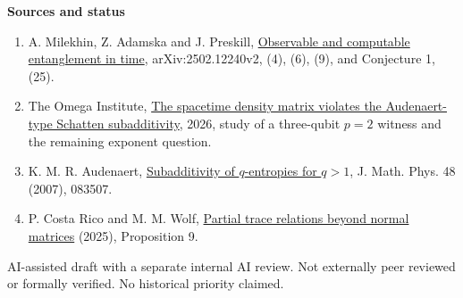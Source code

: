 \documentclass[11pt]{article}
\begin{document}
\textbf{Sources and status}
\begin{enumerate}
\item A. Milekhin, Z. Adamska and J. Preskill, \href{https://arxiv.org/html/2502.12240v2}{Observable and computable entanglement in time}, arXiv:2502.12240v2, (4), (6), (9), and Conjecture 1, (25).
\item The Omega Institute, \href{https://www.trureturing.org/research/milekhin-adamska-preskill-2025-spacetime-schatten-subadditivity/}{The spacetime density matrix violates the Audenaert-type Schatten subadditivity}, 2026, study of a three-qubit $p=2$ witness and the remaining exponent question.
\item K. M. R. Audenaert, \href{https://doi.org/10.1063/1.2771542}{Subadditivity of $q$-entropies for $q>1$}, J. Math. Phys. 48 (2007), 083507.
\item P. Costa Rico and M. M. Wolf, \href{https://arxiv.org/html/2507.18278v1}{Partial trace relations beyond normal matrices} (2025), Proposition 9.
\end{enumerate}
AI-assisted draft with a separate internal AI review. Not externally peer reviewed or formally verified. No historical priority claimed.
\end{document}
